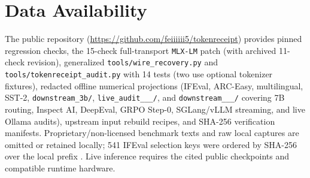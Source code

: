 \documentclass[11pt,letterpaper]{article}
\begin{document}
\section*{Data Availability}
The public repository (\url{https://github.com/feiiiiii5/tokenreceipt}) provides pinned regression checks, the 15-check full-transport \texttt{MLX-LM} patch (with archived 11-check revision), generalized \texttt{tools/\allowbreak wire\_\allowbreak recovery.py} and \texttt{tools/\allowbreak tokenreceipt\_\allowbreak audit.py} with 14 tests (two use optional tokenizer fixtures), redacted offline numerical projections (IFEval, ARC-Easy, multilingual, SST-2, \texttt{downstream\_\allowbreak 3b/}, \texttt{live\_\allowbreak audit\_\_\_/}, and \texttt{downstream\_\_\_/} covering 7B routing, Inspect AI, DeepEval, GRPO Step-0, SGLang/vLLM streaming, and live Ollama audits), upstream input rebuild recipes, and SHA-256 verification manifests. Proprietary/non-licensed benchmark texts and raw local captures are omitted or retained locally; 541 IFEval selection keys were ordered by SHA-256 over the local prefix . Live inference requires the cited public checkpoints and compatible runtime hardware.


\end{document}
